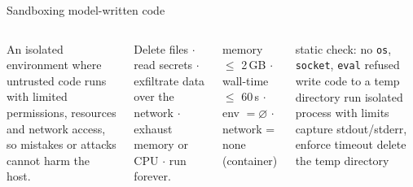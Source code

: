 \documentclass[aspectratio=169,11pt]{beamer}
\begin{document}

\begin{frame}{Sandboxing model-written code}
\begin{columns}[T]
\begin{bdef}[Sandbox]
An isolated environment where untrusted code runs with limited permissions, resources and network access, so mistakes or attacks cannot harm the host.
\end{bdef}
\begin{bdef}
Delete files $\cdot$ read secrets $\cdot$ exfiltrate data over the network $\cdot$ exhaust memory or CPU $\cdot$ run forever.
\end{bdef}
\begin{bmath}
memory $\le$ 2\,GB $\cdot$ wall-time $\le$ 60\,s $\cdot$ env $=\varnothing$ $\cdot$ network = none (container)
\end{bmath}
\begin{balgo}
\begin{algorithmic}[1]
\State static check: no \texttt{os}, \texttt{socket}, \texttt{eval}
 \State \Return refused \EndIf
\State write code to a temp directory
\State run isolated process with limits
\State capture stdout/stderr, enforce timeout
\State delete the temp directory
\end{algorithmic}
\end{balgo}
\end{columns}
\end{frame}
\end{document}
